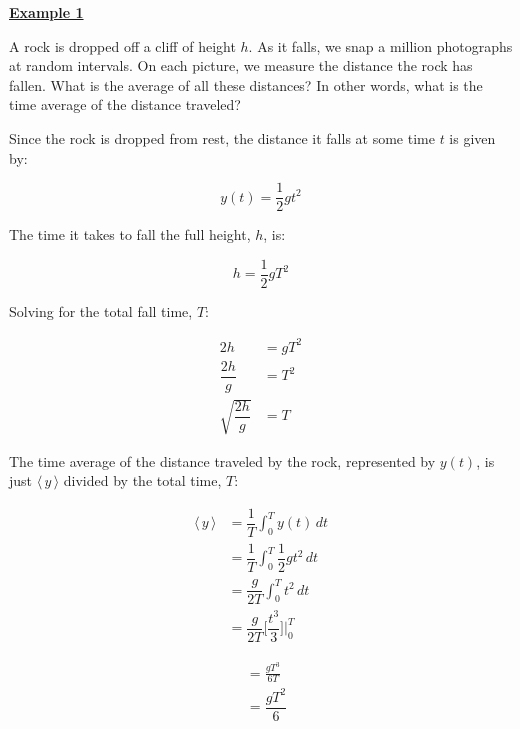 \clearpage

\textbf{\underline{Example 1}}

A rock is dropped off a cliff of height $h$. As it falls, we snap a million photographs at random intervals.
On each picture, we measure the distance the rock has fallen. What is the average of all these distances? In other
words, what is the time average of the distance traveled?

Since the rock is dropped from rest, the distance it falls at some time $t$ is given by:

\[
  y(t) = \dfrac{1}{2}gt^{2}
\]

The time it takes to fall the full height, $h$, is:

\[
  h = \dfrac{1}{2}gT^{2}
\]

Solving for the total fall time, $T$:

\begin{align*}
  2h &= gT^{2} \\[1.5ex]
  \dfrac{2h}{g} &= T^{2} \\[1.5ex]
  \sqrt{\dfrac{2h}{g}} &= T
\end{align*}

The time average of the distance traveled by the rock, represented by $y(t)$, is just
$\langle \, y \, \rangle$ divided by the total time, $T$:

\begin{align*}
  \langle \, y \, \rangle &= \dfrac{1}{T} \int_{0}^{T} y(t) \, dt \\[1.5ex]
  &= \dfrac{1}{T} \int_{0}^{T} \dfrac{1}{2}gt^{2} \, dt \\[1.5ex]
  &= \dfrac{g}{2T} \int_{0}^{T} t^{2} \, dt \\[1.5ex]
  &= \dfrac{g}{2T} \Bigg[ \dfrac{t^{3}}{3} \Bigg] \Bigg|_{0}^{T}
\end{align*}

\newpage

\begin{align*}
  &= \frac{gT^{3}}{6T} \\[1.5ex]
  &= \dfrac{gT^{2}}{6}
\end{align*}